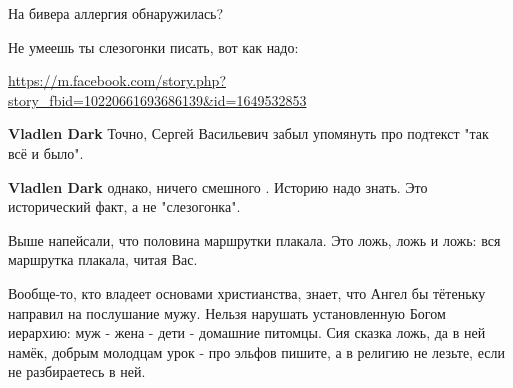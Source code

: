 \begin{itemize}
На бивера аллергия обнаружилась?

 
Не умеешь ты слезогонки писать, вот как надо: \Smiley[1.0][yellow] 

\url{https://m.facebook.com/story.php?story_fbid=10220661693686139&id=1649532853}

\begin{itemize}
 
\textbf{Vladlen Dark} Точно, Сергей Васильевич забыл упомянуть про подтекст "так всё и было".

 
\textbf{Vladlen Dark} однако, ничего смешного . Историю надо знать. Это исторический факт, а не "слезогонка".
\end{itemize}

 
Выше напейсали, что половина маршрутки плакала. Это ложь, ложь и ложь: вся маршрутка плакала, читая Вас.

 

Вообще-то, кто владеет основами христианства, знает, что Ангел бы тётеньку
направил на послушание мужу. Нельзя нарушать установленную Богом иерархию: муж
- жена - дети - домашние питомцы. Сия сказка ложь, да в ней намёк, добрым
молодцам урок - про эльфов пишите, а в религию не лезьте, если не разбираетесь
в ней. \Smiley[1.0][yellow]


\end{itemize}
